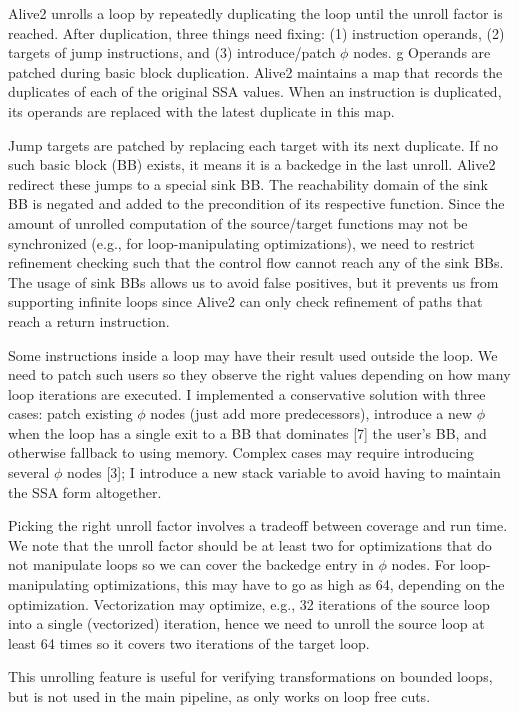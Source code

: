 Alive2 unrolls a loop by repeatedly duplicating the loop until the
unroll factor is reached. After duplication, three things need fixing:
%
(1) instruction operands,
%
(2) targets of jump instructions, and
%
(3) introduce/patch $\phi$ nodes.
g
Operands are patched during basic block duplication. Alive2 maintains
a map that records the duplicates of each of the original SSA values.
When an instruction is duplicated, its operands are replaced with the
latest duplicate in this map.

Jump targets are patched by replacing each target with its next
duplicate. If no such basic block (BB) exists, it means it is a
backedge in the last unroll. Alive2 redirect these jumps to a special
sink BB.
%
The reachability domain of the sink BB is negated and added to the
precondition of its respective function.
%
Since the amount of unrolled computation of the source/target
functions may not be synchronized (e.g., for loop-manipulating
optimizations), we need to restrict refinement checking such that the
control flow cannot reach any of the sink BBs.
%
The usage of sink BBs allows us to avoid false positives, but it
prevents us from supporting infinite loops since Alive2 can only check
refinement of paths that reach a return instruction.

Some instructions inside a loop may have their result used outside the
loop. We need to patch such users so they observe the right values
depending on how many loop iterations are executed.
%
I implemented a conservative solution with three cases: patch existing
$\phi$ nodes (just add more predecessors), introduce a new $\phi$ when
the loop has a single exit to a BB that dominates [7] the user’s BB,
and otherwise fallback to using memory.
%
Complex cases may require introducing several $\phi$ nodes [3]; I
introduce a new stack variable to avoid having to maintain the SSA
form altogether.


Picking the right unroll factor involves a tradeoff between coverage
and run time.
%
We note that the unroll factor should be at least two for
optimizations that do not manipulate loops so we can cover the
backedge entry in $\phi$ nodes.
%
For loop-manipulating optimizations, this may have to go as high as
64, depending on the optimization.
%
Vectorization may optimize, e.g., 32 iterations of the source loop
into a single (vectorized) iteration, hence we need to unroll the
source loop at least 64 times so it covers two iterations of the
target loop.

This unrolling feature is useful for verifying transformations on
bounded loops, but is not used in the main \minotaur{} pipeline, as
\minotaur{} only works on loop free cuts.

